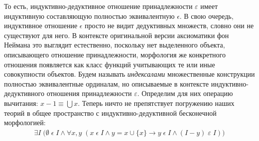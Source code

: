 \documentclass[12pt]{article}
\begin{document}
То есть, индуктивно-дедуктивное отношение принадлежности $\varepsilon$ имеет индуктивную составляющую полностью эквивалентную $\epsilon$. В свою очередь, индуктивное отношение $\epsilon$ просто не видит дедуктивных множеств, словно они не существуют для него. В контексте оригинальной версии аксиоматики фон Неймана это выглядит естественно, поскольку нет выделенного объекта, описывающего отношение принадлежности, морфология же конкретного отношения появляется как класс функций учитывающих те или иные совокупности объектов. Будем называть {\it индексалами} множественные конструкции полностью эквивалентные ординалам, но описываемые в контексте индуктивно-дедуктивного отношения принадлежности $\varepsilon$. Определим для них операцию вычитания: $x - 1 \equiv \bigcup x$. Теперь ничто не препятствует погружению наших теорий в общее пространство с индуктивно-дедуктивной бесконечной морфологией:
\begin{equation}
\begin{gathered}
\exists I \; \bigl(\emptyset \; \epsilon \; I \wedge \forall x, y \; (x \; \epsilon \; I \wedge y = x \cup \{ x \} \to y \; \epsilon \; I \wedge (I - y) \; \varepsilon \; I)\bigr)
\label{axiom:indexal-infinity}
\end{gathered}
\end{equation}
\end{document}
